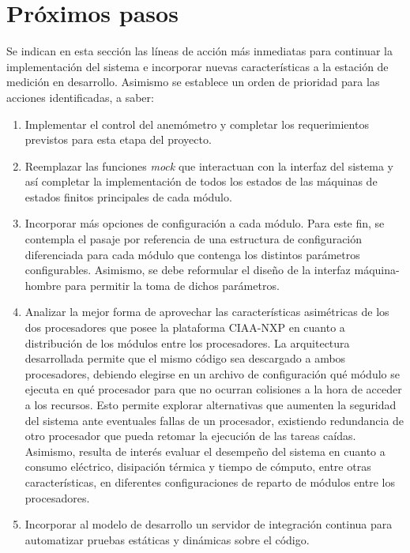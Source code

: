 \section{Próximos pasos}

Se indican en esta sección las líneas de acción más inmediatas para continuar la implementación del sistema e incorporar nuevas características a la estación de medición en desarrollo.  Asimismo se establece un orden de prioridad para las acciones identificadas, a saber:

\begin{enumerate}
  \item Implementar el control del anemómetro y completar los requerimientos previstos para esta etapa del proyecto.
  \item Reemplazar las funciones \textit{mock} que interactuan con la interfaz del sistema y así completar la implementación de todos los estados de las máquinas de estados finitos principales de cada módulo.
  \item Incorporar más opciones de configuración a cada módulo.  Para este fin, se contempla el pasaje por referencia de una estructura de configuración diferenciada para cada módulo que contenga los distintos parámetros configurables.  Asimismo, se debe reformular el diseño de la interfaz máquina-hombre para permitir la toma de dichos parámetros.
  \item Analizar la mejor forma de aprovechar las características asimétricas de los dos procesadores que posee la plataforma CIAA-NXP en cuanto a distribución de los módulos entre los procesadores.  La arquitectura desarrollada permite que el mismo código sea descargado a ambos procesadores, debiendo elegirse en un archivo de configuración qué módulo se ejecuta en qué procesador para que no ocurran colisiones a la hora de acceder a los recursos.  Esto permite explorar alternativas que aumenten la seguridad del sistema ante eventuales fallas de un procesador, existiendo redundancia de otro procesador que pueda retomar la ejecución de las tareas caídas.  Asimismo, resulta de interés evaluar el desempeño del sistema en cuanto a consumo eléctrico, disipación térmica y tiempo de cómputo, entre otras características, en diferentes configuraciones de reparto de módulos entre los procesadores.
  \item Incorporar al modelo de desarrollo un servidor de integración continua \citep{CI} para automatizar pruebas estáticas y dinámicas sobre el código.  

\end{enumerate}
